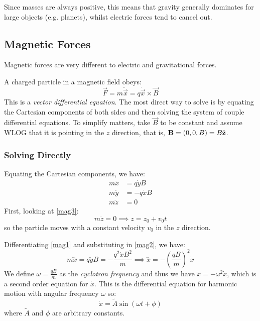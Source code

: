 \documentclass[../main.tex]{subfiles}
\begin{document}
Since masses are always positive, this means that gravity generally dominates for large objects (e.g. planets), whilst electric forces tend to cancel out.

\subsection{Magnetic Forces}
Magnetic forces are very different to electric and gravitational forces.

A charged particle in a magnetic field obeys:
\[
  \vec{F} = m \ddot{\vec{x}} = q \dot{\vec{x}} \times \vec{B}
\]
This is a \textit{vector differential equation}.
The most direct way to solve is by equating the Cartesian components of both sides and then solving the system of couple differential equations.
To simplify matters, take $\vec{B}$ to be constant and assume WLOG that it is pointing in the $z$ direction, that is, $\mathbf{\bm{B}} = (0, 0, B) = B \hat{\mathbf{\bm{z}}}$.
\subsubsection{Solving Directly}
Equating the Cartesian components, we have:
\begin{align}
  m \ddot{x} &= q \dot{y} B \label{mag1} \\
  m \ddot{y} &= -q \dot{x} B \label{mag2} \\
  m \ddot{z} &= 0 \label{mag3}
\end{align}
First, looking at \cref{mag3}:
\[
  m \ddot{z} = 0 \implies z = z_0 + v_0 t
\]
so the particle moves with a constant velocity $v_0$ in the $z$ direction.

Differentiating \cref{mag1} and substituting in \cref{mag2}, we have:
\[
  m \dddot{x} = q \ddot{y}B = - \frac{q^2 \dot{x} B^2}{m} \implies \dddot{x} = - \left(\frac{q B}{m}\right)^2 \dot{x}
\]
We define $\omega = \frac{qB}{m}$ as the \textit{cyclotron frequency} and thus we have $\dddot{x} = -\omega^2 \dot{x}$, which is a second order equation for $\dot{x}$.
This is the differential equation for harmonic motion with angular frequency $\omega$ so:
\[
  \dot{x} = \widetilde{A}\sin(\omega t + \phi)
\]
where $\widetilde{A}$ and $\phi$ are arbitrary constants.
\end{document}
